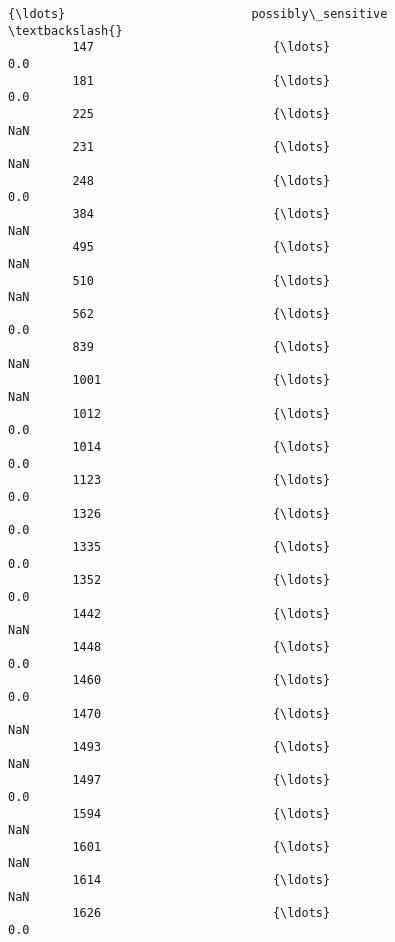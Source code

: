 \documentclass[11pt]{article}
\begin{document}
\begin{Verbatim}[commandchars=\\\{\}]
                                     {\ldots}                          possibly\_sensitive  \textbackslash{}
         147                         {\ldots}                                         0.0   
         181                         {\ldots}                                         0.0   
         225                         {\ldots}                                         NaN   
         231                         {\ldots}                                         NaN   
         248                         {\ldots}                                         0.0   
         384                         {\ldots}                                         NaN   
         495                         {\ldots}                                         NaN   
         510                         {\ldots}                                         NaN   
         562                         {\ldots}                                         0.0   
         839                         {\ldots}                                         NaN   
         1001                        {\ldots}                                         NaN   
         1012                        {\ldots}                                         0.0   
         1014                        {\ldots}                                         0.0   
         1123                        {\ldots}                                         0.0   
         1326                        {\ldots}                                         0.0   
         1335                        {\ldots}                                         0.0   
         1352                        {\ldots}                                         0.0   
         1442                        {\ldots}                                         NaN   
         1448                        {\ldots}                                         0.0   
         1460                        {\ldots}                                         0.0   
         1470                        {\ldots}                                         NaN   
         1493                        {\ldots}                                         NaN   
         1497                        {\ldots}                                         0.0   
         1594                        {\ldots}                                         NaN   
         1601                        {\ldots}                                         NaN   
         1614                        {\ldots}                                         NaN   
         1626                        {\ldots}                                         0.0   

\end{Verbatim}
\end{document}
